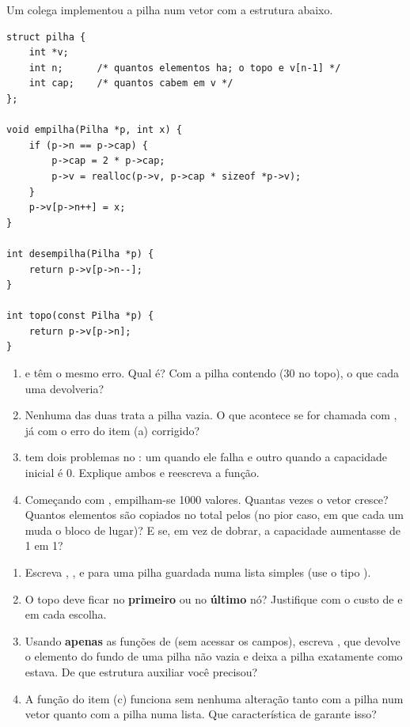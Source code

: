 \documentclass[11pt,a4paper]{article}
\begin{document}
Um colega implementou a pilha num vetor com a estrutura abaixo.

\begin{lstlisting}
struct pilha {
    int *v;
    int n;      /* quantos elementos ha; o topo e v[n-1] */
    int cap;    /* quantos cabem em v */
};

void empilha(Pilha *p, int x) {
    if (p->n == p->cap) {
        p->cap = 2 * p->cap;
        p->v = realloc(p->v, p->cap * sizeof *p->v);
    }
    p->v[p->n++] = x;
}

int desempilha(Pilha *p) {
    return p->v[p->n--];
}

int topo(const Pilha *p) {
    return p->v[p->n];
}
\end{lstlisting}

\begin{enumerate}[label=(\alph*),leftmargin=1.8em,itemsep=1pt]
  \item {} e  têm o mesmo erro. Qual é? Com a pilha contendo
         (30 no topo), o que cada uma devolveria?
  \item Nenhuma das duas trata a pilha vazia. O que acontece se  for
        chamada com , já com o erro do item (a) corrigido?
  \item {} tem dois problemas no : um quando ele falha e outro
        quando a capacidade inicial é 0. Explique ambos e reescreva a função.
  \item Começando com , empilham-se 1000 valores. Quantas vezes o vetor
        cresce? Quantos elementos são copiados no total pelos  (no pior
        caso, em que cada um muda o bloco de lugar)? E se, em vez de dobrar, a
        capacidade aumentasse de 1 em 1?
\end{enumerate}

\begin{enumerate}[label=(\alph*),leftmargin=1.8em,itemsep=1pt]
  \item Escreva , ,  e
         para uma pilha guardada numa lista simples (use o tipo
        ).
  \item O topo deve ficar no \textbf{primeiro} ou no \textbf{último} nó? Justifique
        com o custo de  e  em cada escolha.
  \item Usando \textbf{apenas} as funções de  (sem acessar os campos),
        escreva , que devolve o elemento do fundo de uma
        pilha não vazia e deixa a pilha exatamente como estava. De que estrutura
        auxiliar você precisou?
  \item A função do item (c) funciona sem nenhuma alteração tanto com a pilha num
        vetor quanto com a pilha numa lista. Que característica de 
        garante isso?
\end{enumerate}
\end{document}
